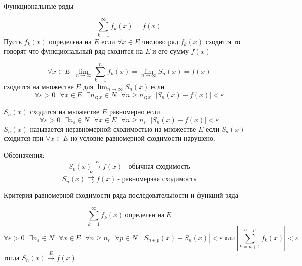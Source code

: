 \begin{title}
  Функциональные ряды
\end{title}

\begin{define}
  $$
  \sum_{k=1}^{\infty} f_k (x) = f(x)
  $$
  Пусть $f_k(x)$ определена на $E$ если $\forall x \in E$ числово ряд $f_k(x)$
  сходится то говорят что функциональный ряд сходится на $E$ и его сумму $f(x)$
\end{define}

\begin{theorem}
  $$
  \forall x \in E ~~~ \lim_{n \to \infty} \sum_{k=1}^n f_k(x) =
  \lim_{n \to \infty} S_n(x) = f(x)
  $$
  сходится на множестве $E$ для $\lim_{n \to \infty} S_n(x)$ если
  $$
  \forall \varepsilon > 0 ~~~ \forall x \in E ~~~ \exists n_{\varepsilon; x}
  \in N ~~~ \forall n \ge n_{\varepsilon; x} ~~~ \left| S_n(x) - f(x) \right|
  < \varepsilon
  $$
\end{theorem}

\begin{define}
  $S_n(x)$ сходится на множестве $E$ равномерно если
  $$
  \forall \varepsilon > 0 ~~~ \exists n_{\varepsilon} \in N ~~~ \forall x \in E
  ~~~ \forall n \ge n_{\varepsilon} ~~~ |S_n (x) - f(x)| < \varepsilon
  $$
  $S_n(x)$ называется неравномерной сходимостью на множестве $E$ если $S_n(x)$
  сходится при $\forall x \in E$ но условие равномерной сходимости нарушено.

  Обозначения:
  $$
  S_n(x) \stackrel{E}{\to} f(x) ~ \text{- обычная сходимость}
  $$
  $$
  S_n(x) \stackrel{E}{\rightrightarrows} f(x) ~ \text{- равномерная сходимость}
  $$
\end{define}

\begin{title}[\Large]
  Критерия равномерной сходимости ряда последовательности и функций ряда
\end{title}

\begin{block}
  $$
  \sum_{k=1}^{\infty} f_k(x) ~ \text{определен на} ~ E
  $$
  $$
  \forall \varepsilon > 0 ~~~ \exists n_{\varepsilon} \in N ~~~
  \forall x \in E ~~~ \forall n \ge n_{\varepsilon} ~~~ \forall p \in N ~~~
  |S_{n+p}(x) - S_n(x)| < \varepsilon ~ \text{или} ~
  \left| \sum_{k = n + 1}^{n+p} f_k(x) \right| < \varepsilon
  $$
  тогда $S_n(x) \stackrel{E}{\rightarrow} f(x)$
\end{block}


